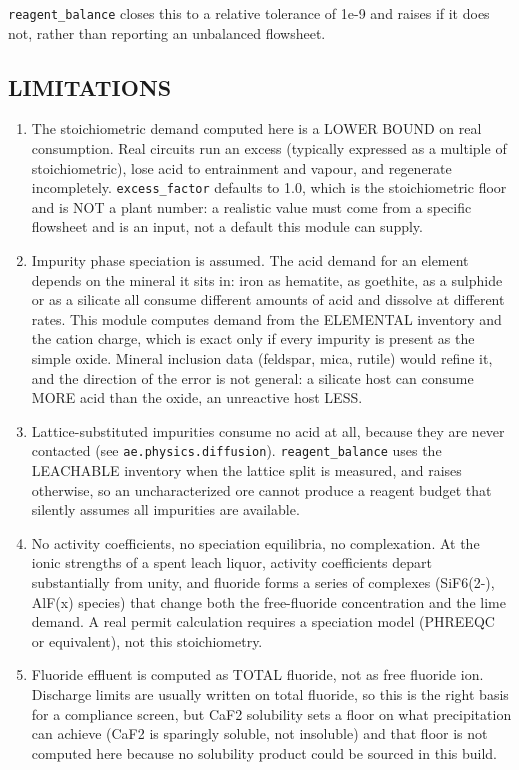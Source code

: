 \documentclass[10pt,a4paper,twoside]{report}
\begin{document}
\texttt{reagent\_balance} closes this to a relative tolerance of 1e-9 and raises if it does not, rather than reporting an unbalanced flowsheet.

\subsection*{LIMITATIONS}

\begin{enumerate}[leftmargin=*,label=\arabic*.]
\item The stoichiometric demand computed here is a LOWER BOUND on real consumption. Real circuits run an excess (typically expressed as a multiple of stoichiometric), lose acid to entrainment and vapour, and regenerate incompletely. \texttt{excess\_factor} defaults to 1.0, which is the stoichiometric floor and is NOT a plant number: a realistic value must come from a specific flowsheet and is an input, not a default this module can supply.
\item Impurity phase speciation is assumed. The acid demand for an element depends on the mineral it sits in: iron as hematite, as goethite, as a sulphide or as a silicate all consume different amounts of acid and dissolve at different rates. This module computes demand from the ELEMENTAL inventory and the cation charge, which is exact only if every impurity is present as the simple oxide. Mineral inclusion data (feldspar, mica, rutile) would refine it, and the direction of the error is not general: a silicate host can consume MORE acid than the oxide, an unreactive host LESS.
\item Lattice-substituted impurities consume no acid at all, because they are never contacted (see \texttt{ae.physics.diffusion}). \texttt{reagent\_balance} uses the LEACHABLE inventory when the lattice split is measured, and raises otherwise, so an uncharacterized ore cannot produce a reagent budget that silently assumes all impurities are available.
\item No activity coefficients, no speciation equilibria, no complexation. At the ionic strengths of a spent leach liquor, activity coefficients depart substantially from unity, and fluoride forms a series of complexes (SiF6(2-), AlF(x) species) that change both the free-fluoride concentration and the lime demand. A real permit calculation requires a speciation model (PHREEQC or equivalent), not this stoichiometry.
\item Fluoride effluent is computed as TOTAL fluoride, not as free fluoride ion. Discharge limits are usually written on total fluoride, so this is the right basis for a compliance screen, but CaF2 solubility sets a floor on what precipitation can achieve (CaF2 is sparingly soluble, not insoluble) and that floor is not computed here because no solubility product could be sourced in this build.

\end{enumerate}
\end{document}
